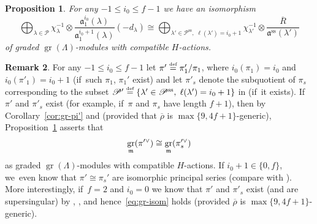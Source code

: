 \documentclass[JEP,XML,SOM,Unicode,NoFloatCountersInSection, NoEqCountersInSection,published]{cedram}
\let\ovl\overline
\newcommand{\defeq}{\stackrel{\textrm{\tiny{\upshape{def}}}}{=}}
\renewcommand{\P}{\mathscr P}
\renewcommand{\ss}{\mathrm{ss}}
\newcommand{\fa}{\mathfrak{a}}
\newcommand{\brho}{\overline{\rho}}
\DeclareMathOperator{\gr}{gr}
\theoremstyle{plain}
\newtheorem{prop}{Proposition}[subsection]
\theoremstyle{definition}
\newtheorem{rem}[prop]{Remark}
\begin{document}
\begin{prop}\label{prop:gr-m-semisimple-nonsplit}
For any $-1 \le i_0 \le f-1$ we have an isomorphism\vspace*{-3pt}
\begin{equation*}
\bigoplus_{\lambda\in\P}\chi_{\lambda}^{-1}\otimes \frac{\fa_1^{i_0}(\lambda)}{\fa_1^{i_0+1}(\lambda)}(-d_\lambda) \cong \bigoplus_{\lambda'\in\P^\ss,\; \ell(\lambda') = i_0+1}\chi_{\lambda'}^{-1}\otimes \frac{\ovl R}{\fa^\ss(\lambda')}
\end{equation*}
of graded $\gr(\Lambda)$-modules with compatible $H$-actions.
\end{prop}

\begin{rem}\label{rem:gr-m-semisimple-nonsplit}
For any $-1 \le i_0 \le f-1$ let $\pi' \defeq \pi_1'/\pi_1$, where $i_0(\pi_1) = i_0$ and $i_0(\pi'_1) = i_0+1$ (if~such $\pi_1$, $\pi_1'$ exist) and let $\pi'_s$ denote the subquotient of $\pi_s$ corresponding to the subset {$\P' \defeq \{\lambda'\in\P^\ss,\; \ell(\lambda') = i_0+1\}$} in \cite[Cor.\,3.2.7(ii)]{BHHMS4} (if~it exists).
If $\pi'$ and $\pi'_s$ exist (for example, if~$\pi$ and $\pi_s$ have length $f+1$), then by Corollary~\ref{cor:gr-pi'} and \cite[Cor.\,3.2.7(iii)]{BHHMS4} {(provided that $\brho$ is $\max\{9,4f+1\}$-generic)}, Proposition~\ref{prop:gr-m-semisimple-nonsplit} asserts that
\begin{equation}\label{eq:gr-isom}
\gr_\m(\pi'^\vee) \cong \gr_\m(\pi_s'^\vee)
\end{equation}
as graded $\gr(\Lambda)$-modules with compatible $H$-actions.
If $i_0+1 \in \{0,f\}$, we~even know that $\pi' \cong \pi_s'$ are isomorphic principal series (compare \cite[Prop.\,10.8]{HuWang2} with \cite[Cor.\,3.92]{BHHMS2}).
More interestingly, if~$f = 2$ and $i_0 = 0$ we know that $\pi'$ and $\pi'_s$ exist (and are supersingular) by \cite[Th.\,1.7]{HuWang2}, \cite[Cor.\,3.92]{BHHMS2}, and hence~\eqref{eq:gr-isom} holds (provided $\brho$ is $\max\{9,4f+1\}$-generic).
\end{rem}
\end{document}
